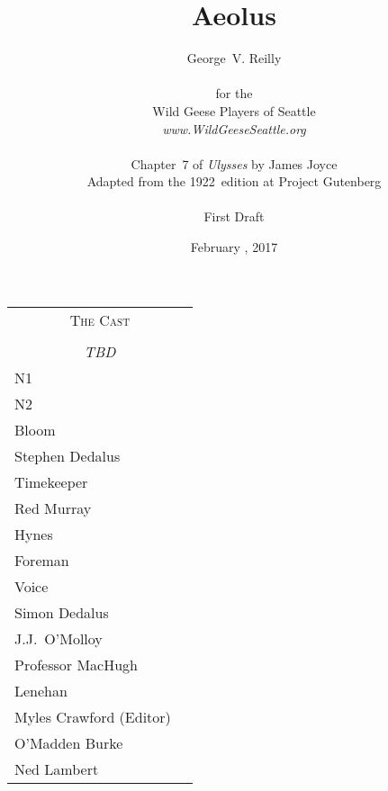 


\title{\Huge Aeolus}
\author{George~V. Reilly\\
\\
{\small for the}\\
Wild Geese Players of Seattle\\
{\emph{www.WildGeeseSeattle.org}}\\
\\
{\small Chapter~7 of \emph{Ulysses} by James Joyce}\\
{\small Adapted from the 1922~edition at Project Gutenberg}
\\
\\
{\small First Draft}}
\date{February , 2017}
\raggedbottom



\maketitle
\thispagestyle{empty}
\pagebreak

\begin{tabular}{lp{10cm}}
    \multicolumn{2}{c}{\Large \textsc{The Cast}} \\
\\
    \multicolumn{2}{c}{\large \textit{TBD}} \\
N1 \\
N2 \\
Bloom \\
Stephen Dedalus \\
Timekeeper \\
Red Murray \\
Hynes \\
Foreman \\
Voice \\
Simon Dedalus \\
J.J.~O'Molloy \\
Professor MacHugh \\
Lenehan \\
Myles Crawford (Editor) \\
O'Madden Burke \\
Ned Lambert \\
\end{tabular}

\thispagestyle{empty}
\newpage


